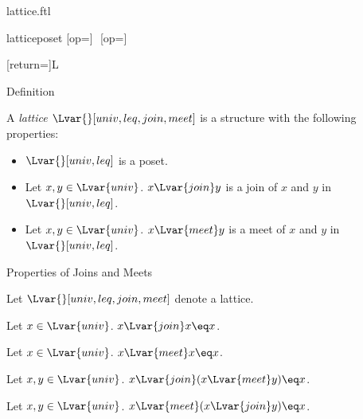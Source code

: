 \documentclass{naproche-library}
\begin{document}
\begin{smodule}[title=Lattices]{lattice.ftl}
\begin{extstructure}{lattice}{poset}
  [op=\vee]{\,\vee\,}
  [op=\wedge]{\,\wedge\,}
\end{extstructure}
[return={\lattice[comp=##1]}]{\mathcal L}

\begin{sfragment}{Definition}
  \begin{signature*}[forthel,id=LatticeSig]
    A \emph{lattice $\Lvar{}[univ,leq,join,meet]$} is a structure with the following properties:
    
    \begin{itemize}
      \item\label{latticeSig}
        $\Lvar{}[univ,leq]$ is a poset.
      \item\label{latticeJoinSig}
        Let $x,y\in\Lvar{univ}$.
        $x{\Lvar{join}}y$ is a join of $x$ and $y$ in $\Lvar{}[univ,leq]$.
      \item\label{latticeMeetSig}
        Let $x,y\in\Lvar{univ}$.
        $x{\Lvar{meet}}y$ is a meet of $x$ and $y$ in $\Lvar{}[univ,leq]$.
    \end{itemize}
  \end{signature*}
\end{sfragment}

\begin{sfragment}{Properties of Joins and Meets}
  \begin{forthel}
    Let $\Lvar{}[univ,leq,join,meet]$ denote a lattice.
  \end{forthel}

  \begin{proposition*}[forthel,id=JoinIdempotenceThm]
    Let $x\in\Lvar{univ}$.
    $x{\Lvar{join}}x\eq x$.
  \end{proposition*}

  \begin{proposition*}[forthel,id=MeetIdempotenceThm]
    Let $x\in\Lvar{univ}$.
    $x{\Lvar{meet}}x\eq x$.
  \end{proposition*}

  \begin{proposition*}[forthel,id=JoinAbsorbsMeetThm]
    Let $x,y\in\Lvar{univ}$.
    $x{\Lvar{join}}(x{\Lvar{meet}}y)\eq x$.
  \end{proposition*}

  \begin{proposition*}[forthel,id=MeetAbsorbsJoinThm]
    Let $x,y\in\Lvar{univ}$.
    $x{\Lvar{meet}}(x{\Lvar{join}}y)\eq x$.
  \end{proposition*}


\end{sfragment}
\end{smodule}
\end{document}
